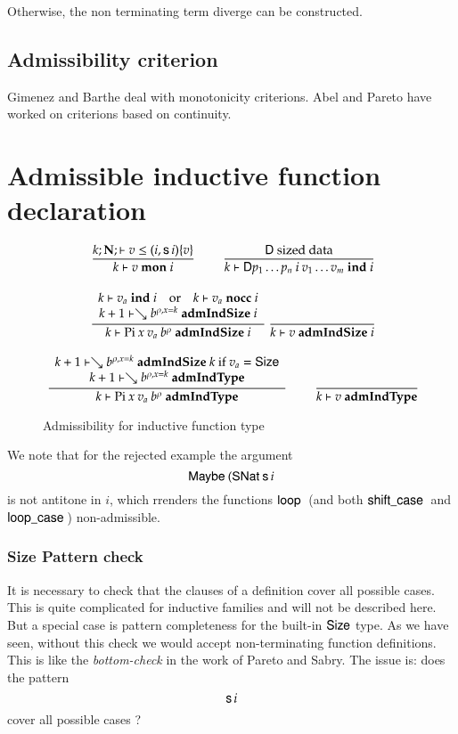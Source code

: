Otherwise, the non terminating term diverge can be constructed.

\subsection{Admissibility criterion}
Gimenez and Barthe deal with monotonicity criterions.
Abel and Pareto have worked on criterions based on continuity.

\newcommand{\mon}[3]{#1\vdash#2\mbox{ \textbf{mon} }#3}
\newcommand{\indu}[3]{#1\vdash#2\mbox{ \textbf{ind} }#3}
\newcommand{\coind}[3]{#1\vdash#2\mbox{ \textbf{coind} }#3}
\newcommand{\admIndSize}[3]{#1\vdash#2\mbox{ \textbf{admIndSize} }#3}
\newcommand{\admCoSize}[3]{#1\vdash#2\mbox{ \textbf{admCoSize} }#3}
\newcommand{\admIndType}[2]{#1\vdash#2\mbox{ \textbf{admIndType}}}
\newcommand{\admCoType}[2]{#1\vdash#2\mbox{ \textbf{admCoType}}}

\section{Admissible inductive function declaration}

\begin{figure}[p]
\begin{gather*}
\nru{}
{\LeqVal{k}{\nF}{v}{\subst{(i,\s i)}{v}}}
{\mon{k}{v}{i}}
\qquad
\nru{}
{\DD \mbox{ sized data}}
{\indu{k}{\DD p_1 \ldots p_n \: i \: v_1 \ldots v_m}{i}}
\\[2ex]
\ndru{}
{\indu{k}{v_a}{i} \quad \mbox{or} \quad \nocc{k}{v_a}{i}}
{\admIndSize{k+1}{\wh \cl{b}{\ins{\rho}{x}{k}}}{i}}
{\admIndSize{k}{\vpi \: x \: v_a \: \cl{b}{\rho}}{i}}
\nru{}
{}
{\admIndSize{k}{v}{i}}
\\[2ex]
\ndru{}
{\admIndSize{k+1}{\wh \cl{b}{\ins{\rho}{x}{k}}}{k} \mbox{ if } v_a = \Size}
{\admIndType{k+1}{\wh \cl{b}{\ins{\rho}{x}{k}}}}
{\admIndType{k}{\vpi \: x \: v_a \: \cl{b}{\rho}}}
\qquad
\nru{}
{}
{\admIndType{k}{v}}
\end{gather*}
\caption{Admissibility for inductive function type}
\end{figure}

We note that for the rejected example the argument \[\mathsf{Maybe}\: (\mathsf{SNat}\: \mathsf{s}\, i\] is not antitone in $i$, which rrenders the functions $\mathsf{loop}\:$ (and both $ \mathsf{shift\_case}\:$ and $\mathsf{loop\_case}\:$) non-admissible.

\subsubsection{Size Pattern check}
It is necessary to check that the clauses of a definition cover all possible cases.
This is quite complicated for inductive families and will not be described here.
But a special case is pattern completeness for the built-in $\mathsf{Size}$ type.
As we have seen, without this check we would accept non-terminating function definitions.
This is like the \emph{bottom-check} in the work of Pareto and Sabry.
The issue is: does the pattern \[ \mathsf{s}\, i \] cover all possible cases ? 


